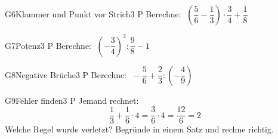\documentclass[11pt]{article}
\begin{document}

\begin{lpaufgabe}{G6}{Klammer und Punkt vor Strich}{3 P}
Berechne: $\;\left(\dfrac{5}{6} - \dfrac{1}{3}\right) \cdot \dfrac{3}{4} + \dfrac{1}{8}$
\end{lpaufgabe}

\begin{lpaufgabe}{G7}{Potenz}{3 P}
Berechne: $\;\left(-\dfrac{3}{4}\right)^2 : \dfrac{9}{8} - 1$
\end{lpaufgabe}

\begin{lpaufgabe}{G8}{Negative Brüche}{3 P}
Berechne: $\;-\dfrac{5}{6} + \dfrac{2}{3} : \left(-\dfrac{4}{9}\right)$
\end{lpaufgabe}

\begin{lpaufgabe}{G9}{Fehler finden}{3 P}
Jemand rechnet:
\[ \frac{1}{3} + \frac{1}{6} \cdot 4 = \frac{3}{6} \cdot 4 = \frac{12}{6} = 2 \]
Welche Regel wurde verletzt? Begründe in einem Satz und rechne richtig.
\end{lpaufgabe}
\end{document}
